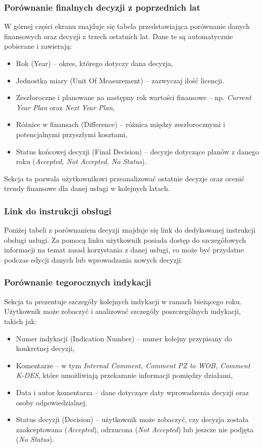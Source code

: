 \subsubsection{Porównanie finalnych decyzji z poprzednich lat}
W górnej części ekranu znajduje się tabela przedstawiająca porównanie danych finansowych oraz decyzji z trzech ostatnich lat. Dane te są automatycznie pobierane i zawierają:
\begin{itemize}
    \item {Rok (Year)} -- okres, którego dotyczy dana decyzja,
    \item {Jednostka miary (Unit Of Measurement)} -- zazwyczaj ilość licencji. 
    \item {Zeszłoroczne i planowane na następny rok wartości finansowe} -- np. \textit{Current Year Plan} oraz \textit{Next Year Plan},
    \item {Różnice w finansach (Difference)} -- różnica między zeszłorocznymi i potencjalnymi przyszłymi kosztami,
    \item {Status końcowej decyzji (Final Decision)} -- decyzje dotyczące planów z danego roku (\textit{Accepted, Not Accepted, No Status}).
\end{itemize}

Sekcja ta pozwala użytkownikowi przeanalizować ostatnie decyzje oraz ocenić trendy finansowe dla danej usługi w kolejnych latach.

\subsubsection{Link do instrukcji obsługi}
Poniżej tabeli z porównaniem decyzji znajduje się link do dedykowanej instrukcji obsługi usługi. Za pomocą linku użytkownik posiada dostęp do szczegółowych informacji na temat zasad korzystania z danej usługi, co może być przydatne podczas edycji danych lub wprowadzania nowych decyzji.

\subsubsection{Porównanie tegorocznych indykacji}
Sekcja ta prezentuje szczegóły kolejnych indykacji w ramach bieżącego roku. Użytkownik może zobaczyć i analizować szczegóły poszczególnych indykacji, takich jak:
\begin{itemize}
    \item {Numer indykacji (Indication Number)} -- numer kolejny przypisany do konkretnej decyzji,
    \item {Komentarze} -- w tym \textit{Internal Comment, Comment PZ to WOB, Comment K-DES}, które umożliwiają przekazanie informacji pomiędzy działami,
    \item {Data i autor komentarza} -- dane dotyczące daty wprowadzenia decyzji oraz osoby odpowiedzialnej,
    \item {Status decyzji (Decision)} -- użytkownik może zobaczyć, czy decyzja została zaakceptowana (\textit{Accepted}), odrzucona (\textit{Not Accepted}) lub jeszcze nie podjęta (\textit{No Status}).
\end{itemize}


